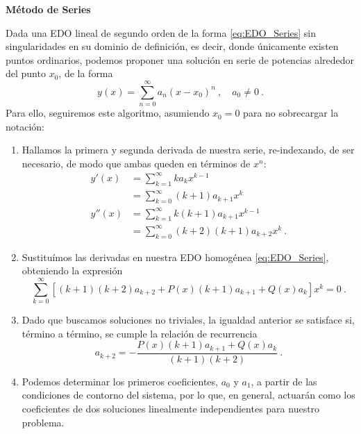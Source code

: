 \begin{propo} 
    \textbf{Método de Series}

    Dada una EDO lineal de segundo orden de la forma \eqref{eq:EDO_Series} sin singularidades en su dominio de definición, es decir, donde únicamente existen puntos ordinarios, podemos proponer una solución en serie de potencias alrededor del punto $x_0$, de la forma
    \begin{equation}
        y(x) = \sum_{n=0}^\infty a_n(x-x_0)^n \ , \quad a_0 \neq 0 \ .
    \end{equation}
    Para ello, seguiremos este algoritmo, asumiendo $x_0 = 0$ para no sobrecargar la notación:
    \begin{enumerate}
        \item Hallamos la primera y segunda derivada de nuestra serie, re-indexando, de ser necesario, de modo que ambas queden en términos de $x^n$:
        \begin{align}
            y'(x) & = \sum_{k=1}^\infty k a_k x^{k-1} \nonumber \\
            & = \sum_{k=0}^\infty (k+1) a_{k+1} x^{k} \\
            y''(x) & = \sum_{k=1}^\infty k (k+1) a_{k+1} x^{k-1} \nonumber \\
            & = \sum_{k=0}^\infty (k+2) (k+1) a_{k+2} x^{k} \ .
        \end{align}
        \item Sustituímos las derivadas en nuestra EDO homogénea \eqref{eq:EDO_Series}, obteniendo la expresión
        \begin{equation*}
            \sum_{k=0}^\infty [ (k+1)(k+2)a_{k+2} + P(x) (k+1)a_{k+1} + Q(x) a_k ] x^k = 0 \ .
        \end{equation*}
        \item Dado que buscamos soluciones no triviales, la igualdad anterior se satisface si, término a término, se cumple la relación de recurrencia
        \begin{equation}
            a_{k+2} = -\frac{P(x) (k+1)a_{k+1} + Q(x) a_k}{(k+1)(k+2)} \ .
        \end{equation}
        \item Podemos determinar los primeros coeficientes, $a_0$ y $a_1$, a partir de las condiciones de contorno del sistema, por lo que, en general, actuarán como los coeficientes de dos soluciones linealmente independientes para nuestro problema.
    \end{enumerate}
\end{propo}

